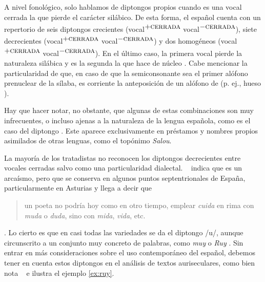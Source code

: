 A nivel fonológico,  solo hablamos de diptongos propios cuando es una vocal cerrada la que pierde el carácter silábico. De esta forma, el español cuenta con un repertorio de seis diptongos crecientes (vocal\textsuperscript{$+\textsc{cerrada}$} vocal\textsuperscript{$-\textsc{cerrada}$}),  siete decrecientes (vocal\textsuperscript{$+\textsc{cerrada}$} vocal\textsuperscript{$-\textsc{cerrada}$}) y dos homogéneos (vocal\textsuperscript{$+\textsc{cerrada}$} vocal\textsuperscript{$-\textsc{cerrada}$}). En el último caso, la primera vocal pierde la naturaleza silábica y es la segunda la que hace de núcleo \parencite{quilis2019}. Cabe mencionar la particularidad de que, en caso de que la semiconsonante \textipa{[w]} sea el primer alófono prenuclear de la sílaba, es corriente la anteposición de un alófono de  (p. ej., \textlangle{}hueso\textrangle{} ).


Hay que hacer notar, no obstante, que algunas de estas combinaciones son muy infrecuentes, o incluso ajenas a la naturaleza de la lengua española, como es el caso del diptongo \ipa{[ou̯]}. Este aparece exclusivamente en préstamos y nombres propios asimilados de otras lenguas, como el topónimo \textit{Salou}.

La mayoría de los tratadistas \parencites{navarrotomas2004}{quilis2019}{alarcos1964} no reconocen los diptongos decrecientes entre vocales cerradas salvo como una particularidad dialectal. \citeauthor{navarrotomas2004}~\parencite*[149]{navarrotomas2004} indica que es un arcaísmo, pero que se conserva en algunos puntos septentrionales de España, particularmente en Asturias y llega a decir que \blockquote{un poeta no podría hoy como en otro tiempo, emplear \textit{cuida} en rima con \textit{muda} o \textit{duda}, sino con \textit{mida}, \textit{vida}, etc.} \parencite{navarrotomas2004}. Lo cierto es que en casi todas las variedades se da el diptongo /u/, aunque circunscrito a un conjunto muy concreto de palabras, como \textit{muy} o \textit{Ruy} \parencite{calderon1991}. Sin entrar en más consideraciones sobre el uso contemporáneo del español, debemos tener en cuenta estos diptongos en el análisis de textos auriseculares, como bien nota \citeauthor{bello1981}~\parencite*[94]{bello1981} e ilustra el ejemplo \ref{ex:ruy}.

